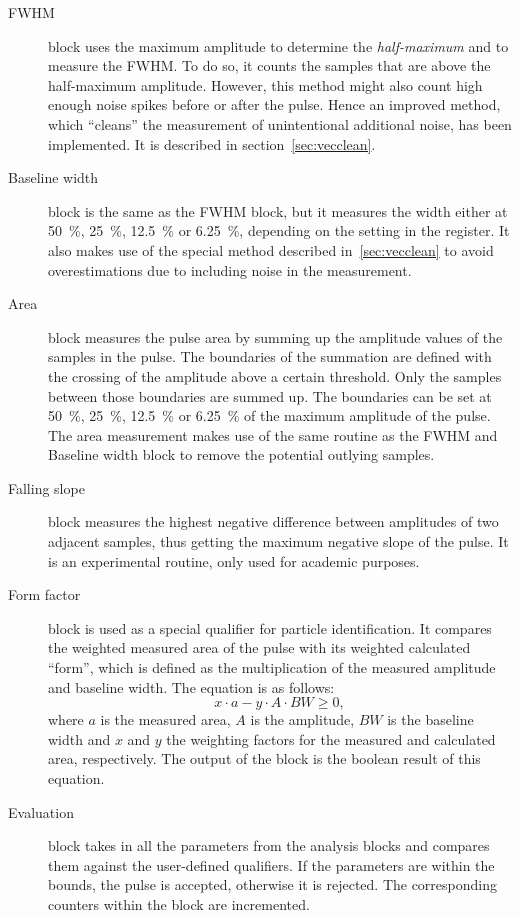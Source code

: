 \documentclass[12pt]{packages/mytustyle}  %
\begin{document}
\begin{description}
\item[FWHM] block uses the maximum amplitude to determine the \emph{half-maximum} and to measure the FWHM. To do so, it counts the samples that are above the half-maximum amplitude. However, this method might also count high enough noise spikes before or after the pulse. Hence an improved method, which ``cleans'' the measurement of unintentional additional noise, has been implemented. It is described in section~\ref{sec:vecclean}.
\item[Baseline width] block is the same as the FWHM block, but it measures the width either at 50~\%, 25~\%, 12.5~\% or 6.25~\%, depending on the setting in the register. It also makes use of the special method described in~\ref{sec:vecclean} to avoid overestimations due to including noise in the measurement.
\item[Area] block measures the pulse area by summing up the amplitude values of the samples in the pulse. The boundaries of the summation are defined with the crossing of the amplitude above a certain threshold. Only the samples between those boundaries are summed up. The boundaries can be set at  50~\%, 25~\%, 12.5~\% or 6.25~\% of the maximum amplitude of the pulse. The area measurement makes use of the same routine as the FWHM and Baseline width block to remove the potential outlying samples.

\item[Falling slope] block measures the highest negative difference between amplitudes of two adjacent samples, thus getting the maximum negative slope of the pulse. It is an experimental routine, only used for academic purposes.
\item[Form factor] block is used as a special qualifier for particle identification. It compares the weighted measured area of the pulse with its weighted calculated ``form'', which is defined as the multiplication of the measured amplitude and baseline width. The equation is as follows:
\begin{equation}
\label{eq:formfactor1}
x\cdot a - y \cdot A \cdot BW \geq 0,
\end{equation}
where $a$ is the measured area, $A$ is the amplitude, $BW$ is the baseline width and $x$ and $y$ the weighting factors for the measured and calculated area, respectively. The output of the block is the boolean result of this equation.
\item[Evaluation] block takes in all the parameters from the analysis blocks and compares them against the user-defined qualifiers. If the parameters are within the bounds, the pulse is accepted, otherwise it is rejected. The corresponding counters within the block are incremented.

\end{description}
\end{document}
